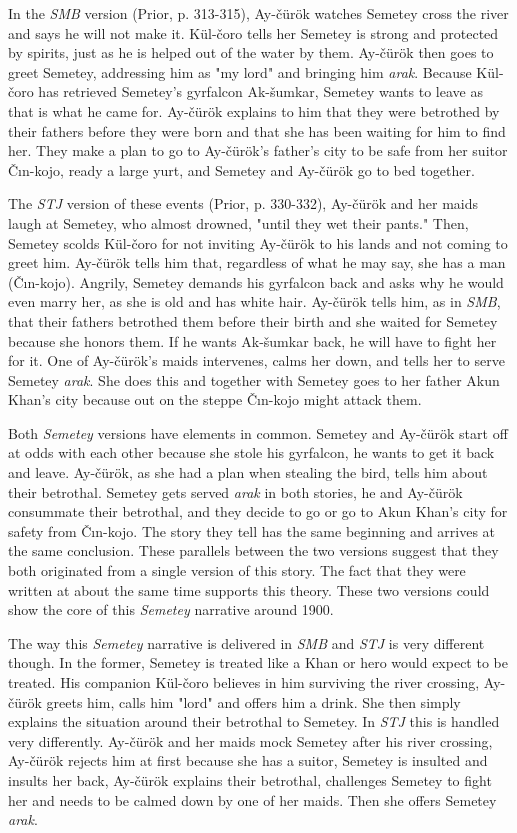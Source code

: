 \documentclass[12pt,a4paper]{article}
\newcommand{\Se} {Semetey}
\newcommand{\Ac} {Ay-čürök}
\newcommand{\Ck} {Čın-kojo}
\newcommand{\As} {Ak-šumkar}
\newcommand{\Ak} {Akun Khan}
\newcommand{\Mbs}{\emph{SMB}}
\newcommand{\Tjs}{\emph{STJ}}
\newcommand{\Kuc}{Kül-čoro}
\begin{document}
In the \Mbs{} version (Prior, p. 313-315), \Ac{} watches
\Se{} cross the river and says he will not make it. \Kuc{} tells her \Se{} is
strong and protected by spirits, just as he is helped out of the water by them.
\Ac{} then goes to greet \Se{}, addressing him as "my lord" and bringing him
\emph{arak}. Because \Kuc{} has retrieved \Se{}'s gyrfalcon \As{}, \Se{} wants to
leave as that is what he came for. \Ac{} explains to him that they were
betrothed by their fathers before they were born and that she has been waiting
for him to find her. They make a plan to go to \Ac{}'s father's city to be safe from
her suitor \Ck{}, ready a large yurt, and \Se{} and \Ac{} go to bed
together. 

The \Tjs{} version of these events (Prior, p. 330-332), \Ac{} and
her maids laugh at \Se{}, who almost drowned, "until they wet their pants."
Then, \Se{} scolds \Kuc{} for not inviting \Ac{} to his lands and 
not coming to greet him. \Ac{} tells him that, regardless of what he may say,
she has a man (\Ck{}). Angrily, \Se{} demands his gyrfalcon back and asks why he would 
even marry her, as she is old and has white hair. \Ac{} tells him, as in
\Mbs{}, that their fathers betrothed them before their birth and she waited for
\Se{} because she honors them. If he wants \As{} back, he will have to fight
her for it. One of \Ac{}'s maids intervenes, calms her down, and tells
her to serve \Se{} \emph{arak}. She does this and together with \Se{} goes to
her father \Ak{}'s city because out on the steppe \Ck{} might attack them.

Both \emph{\Se{}} versions have elements in common. \Se{} and \Ac{}
start off at odds with each other because she stole his gyrfalcon, he 
wants to get it back and leave. \Ac{}, as she had a plan when stealing the
bird, tells him about their betrothal. \Se{} gets served \emph{arak} in both
stories, he and \Ac{} consummate their betrothal, and they decide to go or go 
to \Ak{}'s city for safety from \Ck{}. The story they tell has the same beginning 
and arrives at the same conclusion. These parallels between the two versions
suggest that they both originated from a single version of this story. The fact
that they were written at about the same time supports this theory. These two
versions could show the core of this \emph{\Se{}} narrative around 1900. 

The way this \emph{\Se{}} narrative is delivered in \Mbs{} and \Tjs{} is very 
different though. In the former, \Se{} is treated like a Khan or hero would
expect to be treated. His companion \Kuc{} believes in him surviving the river
crossing, \Ac{} greets him, calls him "lord" and offers him a drink. She then
simply explains the situation around their betrothal to \Se{}. In \Tjs{} this
is handled very differently. \Ac{} and her maids mock \Se{} after his river
crossing, \Ac{} rejects him at first because she has a suitor, \Se{} is
insulted and insults her back, \Ac{} explains their betrothal, challenges \Se{}
to fight her and needs to be calmed down by one of her maids. Then 
she offers \Se{} \emph{arak}. 
\end{document}
